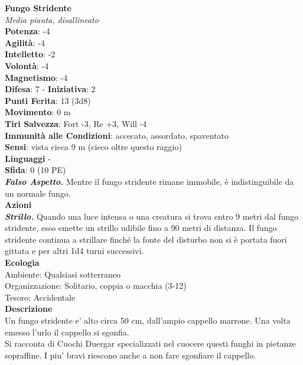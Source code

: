 \begin{multicols}{2}
\medskip\textbf{Fungo Stridente}\\
\emph{Media pianta, disallineato}\\
\textbf{Potenza}: -4\\
\textbf{Agilità}: -4\\
\textbf{Intelletto}: -2\\
\textbf{Volontà}: -4\\
\textbf{Magnetismo}: -4\\
\textbf{Difesa}: 7 - \textbf{Iniziativa}: 2\\
\textbf{Punti Ferita}: 13 (3d8)\\
\textbf{Movimento}: 0 m\\
\textbf{Tiri Salvezza}: Fort -3, Re +3, Will -4\\
\textbf{Immunità alle Condizioni}: accecato, assordato, spaventato\\
\textbf{Sensi}: vista cieca 9 m (cieco oltre questo raggio)\\
\textbf{Linguaggi} -\\
\textbf{Sfida}: 0 (10 PE)\smallskip\\
\emph{\textbf{Falso Aspetto.}} Mentre il fungo stridente rimane immobile, è indistinguibile da un normale fungo.\\
\smallskip\textbf{Azioni}\\
\emph{\textbf{Strillo.}} Quando una luce intensa o una creatura si trova entro 9 metri dal fungo stridente, esso emette un strillo udibile fino a 90 metri di distanza. Il fungo stridente continua a strillare finché la fonte del disturbo non si è portata fuori gittata e per altri 1d4 turni successivi.\\
\textbf{Ecologia}\\
Ambiente: Qualsiasi sotterraneo\\
Organizzazione: Solitario, coppia o macchia (3-12)\\
Tesoro: Accidentale\\
\textbf{Descrizione}\\
Un fungo stridente e' alto circa 50 cm, dall'ampio cappello marrone. Una volta emesso l'urlo il cappello si sgonfia. \\
Si racconta di Cuochi Duergar specializzati nel cuocere questi funghi in pietanze sopraffine.
I piu' bravi riescono anche a non fare sgonfiare il cappello.\\


\end{multicols}
